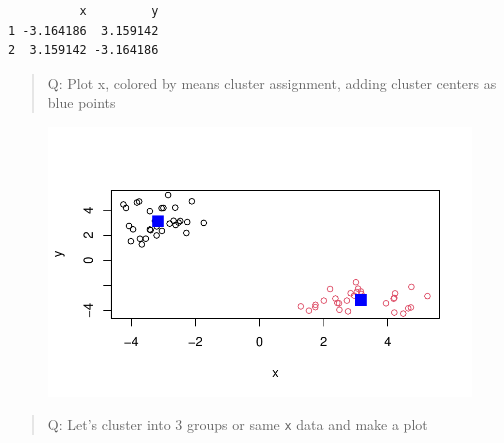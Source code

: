 \documentclass[
  letterpaper,
  DIV=11,
  numbers=noendperiod]{scrartcl}
\newenvironment{Shaded}{\begin{snugshade}}{\end{snugshade}}
\newcommand{\AttributeTok}[1]{\textcolor[rgb]{0.40,0.45,0.13}{#1}}
\newcommand{\DecValTok}[1]{\textcolor[rgb]{0.68,0.00,0.00}{#1}}
\newcommand{\FunctionTok}[1]{\textcolor[rgb]{0.28,0.35,0.67}{#1}}
\newcommand{\NormalTok}[1]{\textcolor[rgb]{0.00,0.23,0.31}{#1}}
\newcommand{\OtherTok}[1]{\textcolor[rgb]{0.00,0.23,0.31}{#1}}
\newcommand{\SpecialCharTok}[1]{\textcolor[rgb]{0.37,0.37,0.37}{#1}}
\newcommand{\StringTok}[1]{\textcolor[rgb]{0.13,0.47,0.30}{#1}}
\begin{document}
\begin{verbatim}
          x         y
1 -3.164186  3.159142
2  3.159142 -3.164186
\end{verbatim}

\begin{quote}
Q: Plot x, colored by means cluster assignment, adding cluster centers
as blue points
\end{quote}

\begin{Shaded}
\end{Shaded}

\begin{figure}[H]

{\centering \includegraphics{Class07_files/figure-pdf/unnamed-chunk-6-1.pdf}

}

\end{figure}

\begin{quote}
Q: Let's cluster into 3 groups or same \texttt{x} data and make a plot
\end{quote}

\begin{Shaded}
\end{Shaded}
\end{document}
